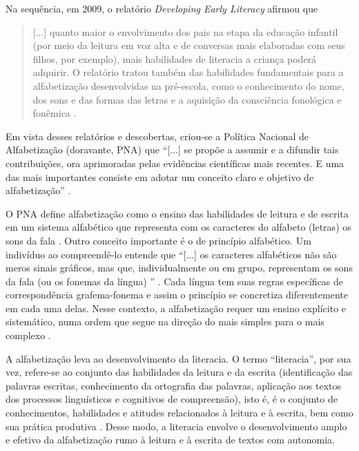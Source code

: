 \documentclass{textolivre}
\begin{document}
Na sequência, em 2009, o relatório \emph{Developing Early Literacy} \cite{nationalearly2009} afirmou que 

\begin{quote}
[...] quanto maior o envolvimento dos pais na etapa da educação infantil (por meio da leitura em voz alta e de conversas mais elaboradas com seus filhos, por exemplo), mais habilidades de literacia a criança poderá adquirir. O relatório tratou também das habilidades fundamentais para a alfabetização desenvolvidas na pré-escola, como o conhecimento do nome, dos sons e das formas das letras e a aquisição da consciência fonológica e fonêmica \cite[p. 16]{brasil2019}.
\end{quote}

Em vista desses relatórios e descobertas, criou-se a Política Nacional de Alfabetização (doravante, PNA) que “[...] se propõe a assumir e a difundir tais contribuições, ora aprimoradas pelas evidências científicas mais recentes. E uma das mais importantes consiste em adotar um conceito claro e objetivo de alfabetização” \cite[p. 17]{brasil2019}.

O PNA define alfabetização como o ensino das habilidades de leitura e de escrita em um sistema alfabético que representa com os caracteres do alfabeto (letras) os sons da fala \cite{morais2014}. Outro conceito importante é o de princípio alfabético. Um indivíduo ao compreendê-lo entende que “[...] os caracteres alfabéticos não são meros sinais gráficos, mas que, individualmente ou em grupo, representam os sons da fala (ou os fonemas da língua) ” \cite[p. 18]{brasil2019}. Cada língua tem suas regras específicas de correspondência grafema-fonema e assim o princípio se concretiza diferentemente em cada uma delas. Nesse contexto, a alfabetização requer um ensino explícito e sistemático, numa ordem que segue na direção do mais simples para o mais complexo \cite[p. 18]{brasil2019}. 

A alfabetização leva ao desenvolvimento da literacia. O termo “literacia”, por sua vez, refere-se ao conjunto das habilidades da leitura e da escrita (identificação das palavras escritas, conhecimento da ortografia das palavras, aplicação aos textos dos processos linguísticos e cognitivos de compreensão), isto é, é o conjunto de conhecimentos, habilidades e atitudes relacionados à leitura e à escrita, bem como sua prática produtiva \cite{morais2013, morais2014}. Desse modo, a literacia envolve o desenvolvimento amplo e efetivo da alfabetização rumo à leitura e à escrita de textos com autonomia.
\end{document}
